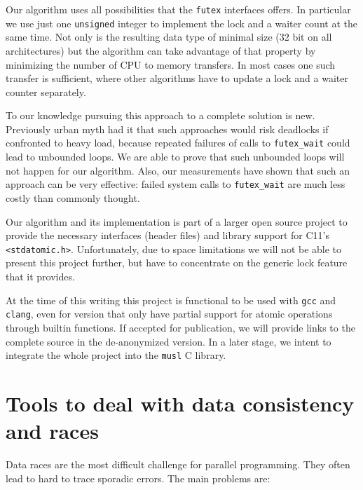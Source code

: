 Our algorithm uses all possibilities that the \texttt{futex} interfaces
offers. In particular we use just one \texttt{unsigned} integer to
implement the lock and a waiter count at the same time. Not only is
the resulting data type of minimal size (32 bit on all
architectures) but the algorithm can take advantage of that property
by minimizing the number of CPU to memory transfers. In most cases
one such transfer is sufficient, where other algorithms have to
update a lock and a waiter counter separately.

To our knowledge pursuing this approach to a complete solution is
new. Previously urban myth had it that such approaches would risk
deadlocks if confronted to heavy load, because repeated failures of
calls to \texttt{futex\_wait} could lead to unbounded loops. We are able to
prove that such unbounded loops will not happen for our algorithm.
Also, our measurements have shown that such an approach can be very
effective: failed system calls to \texttt{futex\_wait} are much less costly
than commonly thought.

Our algorithm and its implementation is part of a larger open
source project to provide the necessary interfaces (header files)
and library support for C11's \texttt{<stdatomic.h>}. Unfortunately, due to
space limitations we will not be able to present this project
further, but have to concentrate on the generic lock feature that it
provides.

At the time of this writing this project is functional to be used
with \texttt{gcc} and \texttt{clang}, even for version that only have partial
support for atomic operations through builtin functions. If accepted
for publication, we will provide links to the complete source in the
de-anonymized version. In a later stage, we intent to integrate the
whole project into the \texttt{musl} C library.

\section{Tools to deal with data consistency and races}
\label{sec-2}

Data races are the most difficult challenge for parallel
programming. They often lead to hard to trace sporadic errors. The
main problems are:\vspace*{-2ex}

